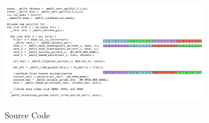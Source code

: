 \documentclass[10pt,conference,compsocconf]{IEEEtran}
\begin{document}
\begin{figure}
  \centering
  \includegraphics[width=0.8\textwidth]{figures/source_code.pdf}%
  \label{fig:source}
  \caption{Source Code}
\end{figure}

%
%
%
%
%
%
%
\end{document}
